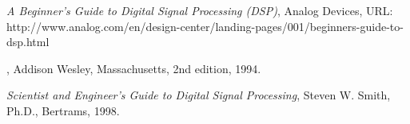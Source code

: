 \documentclass[11pt,a4paper]{article}
\begin{document}
	\begin{thebibliography}{9}

  		
  		\textit{A Beginner's Guide to Digital Signal Processing (DSP)},
  		Analog Devices,
  		URL: http://www.analog.com/en/design-center/landing-pages/001/beginners-guide-to-dsp.html 

	
	\bibitem{}
  		
  		\textit{},
  		Addison Wesley, Massachusetts,
  		2nd edition,
  		1994.
  		
  		
  		\textit{Scientist and Engineer's Guide to Digital Signal Processing},
  		Steven W. Smith, Ph.D., 
  		Bertrams,
  		1998.  		
		
	\end{thebibliography}
\end{document}
